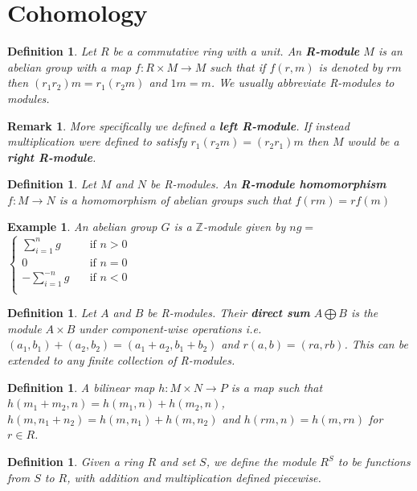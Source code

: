 \documentclass{article}
\newtheorem{definition}[theorem]{Definition}
\newtheorem{example}[theorem]{Example}
\newtheorem{remark}[theorem]{Remark}
\begin{document}
\section{Cohomology}

\begin{definition}
Let $R$ be a commutative ring with a unit. An \textbf{R-module} $M$ is an abelian group with a map $f\colon R\times M\to M$ such that if $f(r,m)$ is denoted by $rm$ then $(r_1r_2)m=r_1(r_2m)$ and $1m=m$. We usually abbreviate R-modules to modules.
\end{definition}
\begin{remark}
More specifically we defined a \textbf{left R-module}. If instead multiplication were defined to satisfy $r_1(r_2m)=(r_2r_1)m$ then $M$ would be a \textbf{right R-module}.
\end{remark}

\begin{definition}
Let $M$ and $N$ be R-modules. An \textbf{R-module homomorphism} $f\colon M\to N$ is a homomorphism of abelian groups such that $f(rm)=rf(m)$ 
\end{definition}

\begin{example}
An abelian group $G$ is a $\mathbb{Z}$-module given by $ng=$$\begin{cases}
       \sum_{i=1}^ng &\quad\text{if }n>0 \\
       0 &\quad\text{if }n=0 \\
       -\sum_{i=1}^{-n}g &\quad\text{if }n<0 \\
     \end{cases}$\\
\end{example}

\begin{definition}
Let $A$ and $B$ be R-modules. Their \textbf{direct sum} $A\bigoplus B$ is the module $A\times B$ under component-wise operations i.e. $(a_1,b_1)+(a_2,b_2)=(a_1+a_2,b_1+b_2)$ and $r(a,b)=(ra,rb)$. This can be extended to any finite collection of R-modules.
\end{definition}

\begin{definition}
A bilinear map $h\colon M\times N\to P$ is a map such that $h(m_1+m_2,n)=h(m_1,n)+h(m_2,n)$, $h(m,n_1+n_2)=h(m,n_1)+h(m,n_2)$ and $h(rm,n)=h(m,rn)$ for $r\in R$.
\end{definition}

\begin{definition}
Given a ring $R$ and set $S$, we define the module $R^S$ to be functions from $S$ to $R$, with addition and multiplication defined piecewise.
\end{definition}
\end{document}
